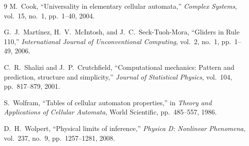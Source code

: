 \documentclass[11pt, a4paper]{article}
\begin{document}
\begin{thebibliography}{9}
M.~Cook, ``Universality in elementary cellular automata,'' \emph{Complex Systems}, vol.~15, no.~1, pp.~1--40, 2004.

G.~J.~Mart\'inez, H.~V.~McIntosh, and J.~C.~Seck-Tuoh-Mora, ``Gliders in Rule 110,'' \emph{International Journal of Unconventional Computing}, vol.~2, no.~1, pp.~1--49, 2006.

C.~R.~Shalizi and J.~P.~Crutchfield, ``Computational mechanics: Pattern and prediction, structure and simplicity,'' \emph{Journal of Statistical Physics}, vol.~104, pp.~817--879, 2001.

S.~Wolfram, ``Tables of cellular automaton properties,'' in \emph{Theory and Applications of Cellular Automata}, World Scientific, pp.~485--557, 1986.

D.~H.~Wolpert, ``Physical limits of inference,'' \emph{Physica D: Nonlinear Phenomena}, vol.~237, no.~9, pp.~1257--1281, 2008.
\end{thebibliography}
\end{document}
